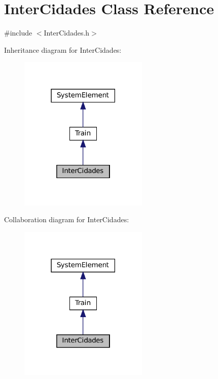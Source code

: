 \hypertarget{classInterCidades}{}\section{Inter\+Cidades Class Reference}
\label{classInterCidades}


{\ttfamily \#include $<$Inter\+Cidades.\+h$>$}



Inheritance diagram for Inter\+Cidades\+:
\nopagebreak
\begin{figure}[H]
\begin{center}
\leavevmode
\includegraphics[width=174pt]{classInterCidades__inherit__graph}
\end{center}
\end{figure}


Collaboration diagram for Inter\+Cidades\+:
\nopagebreak
\begin{figure}[H]
\begin{center}
\leavevmode
\includegraphics[width=174pt]{classInterCidades__coll__graph}
\end{center}
\end{figure}
